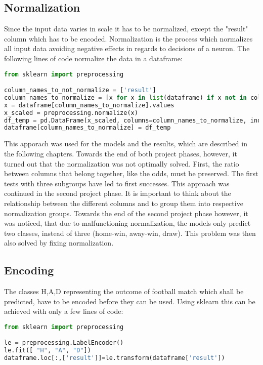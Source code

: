 \subsection {Normalization}
Since the input data varies in scale it has to be normalized, except the "result" column which has to be encoded. Normalization is the process which normalizes all input data avoiding negative effects in regards to decisions of a neuron. 
The following lines of code normalize the data in a dataframe:

\begin{lstlisting}[language=Python, caption=Python code for normalization]
from sklearn import preprocessing

column_names_to_not_normalize = ['result']
column_names_to_normalize = [x for x in list(dataframe) if x not in column_names_to_not_normalize ]
x = dataframe[column_names_to_normalize].values
x_scaled = preprocessing.normalize(x)
df_temp = pd.DataFrame(x_scaled, columns=column_names_to_normalize, index = dataframe.index)
dataframe[column_names_to_normalize] = df_temp
\end{lstlisting}

This apporach was used for the models and the results, which are described in the following chapters. Towards the end of both project phases, however, it turned out that the normalization was not optimally solved. First, the ratio between columns that belong together, like the odds, must be preserved. The first tests with three subgroups have led to first successes. This approach was continued in the second project phase. It is important to think about the relationship between the different columns and to group them into respective normalization groups. Towards the end of the second project phase however, it was noticed, that due to malfunctioning normalization, the models only predict two classes, instead of three (home-win, away-win, draw). This problem was then also solved by fixing normalization.


\subsection {Encoding}

The classes H,A,D representing the outcome of football match which shall be predicted, have to be encoded before they can be used. Using sklearn this can be achieved with only a few lines of code:

\begin{lstlisting}[language=Python, caption=Python code for encoding classes]
from sklearn import preprocessing

le = preprocessing.LabelEncoder()
le.fit([ "H", "A", "D"])
dataframe.loc[:,['result']]=le.transform(dataframe['result'])
\end{lstlisting}



